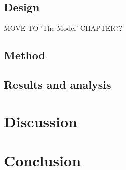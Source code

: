 \documentclass[a4paper, 12pt, notitlepage]{report}
\numberwithin{equation}{subsection}
\theoremstyle{definition}
\theoremstyle{theorem}
\theoremstyle{definition}
\begin{document}
\section{Design}
MOVE TO 'The Model' CHAPTER??

\section{Method}

\section{Results and analysis}


\chapter{Discussion}


\chapter{Conclusion}
\end{document}
